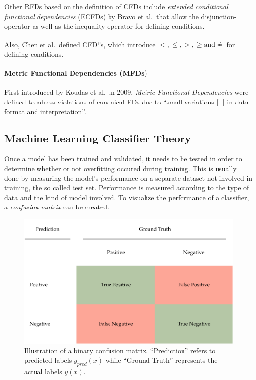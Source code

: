Other RFDs based on the definition of CFDs include \emph{extended conditional functional dependencies} (ECFDs) by Bravo et al.\ that allow the disjunction-operator as well as the inequality-operator for defining conditions.\cite{BRA08}

Also, Chen et al.\ defined CFD\textsuperscript{p}s, which introduce \( <, \leq, >, \geq \text{and} \neq \) for defining conditions.\cite{CHE09}

\paragraph{Metric Functional Dependencies (MFDs)}
First introduced by Koudas et al.\ in 2009, \emph{Metric Functional Dependencies} were defined to adress violations of canonical FDs due to ``small variations [\dots] in data format and interpretation''.


\newpage
\subsection{Machine Learning Classifier Theory}
Once a model has been trained and validated, it needs to be tested in order to determine whether or not overfitting occured during training.
This is usually done by measuring the model's performance on a separate dataset not involved in training, the so called test set.
Performance is measured according to the type of data and the kind of model involved.
To visualize the performance of a classifier, a \emph{confusion matrix} can be created.
\begin{figure}[h]
     \centering
     \includegraphics[width=.8\textwidth]{images/binary-confusion-matrix.pdf}
     \caption{Illustration of a binary confusion matrix.
     ``Prediction'' refers to predicted labels \(y_{pred}(x)\) while ``Ground Truth'' represents the actual labels \(y(x)\).}
     \label{fig:confusion-matrix}
 \end{figure}

